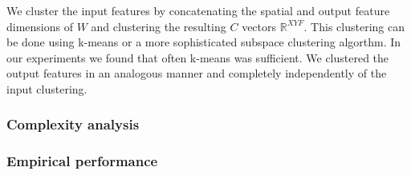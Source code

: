 We cluster the input features by concatenating the spatial and output feature dimensions of $W$ and clustering the resulting $C$ vectors $\mathbb{R}^{XYF}$. This clustering can be done using k-means or a more sophisticated subspace clustering algorthm. In our experiments we found that often k-means was sufficient. We clustered the output features in an analogous manner and completely independently of the input clustering. 

 


\subsubsection{Complexity analysis}

\subsubsection{Empirical performance}


